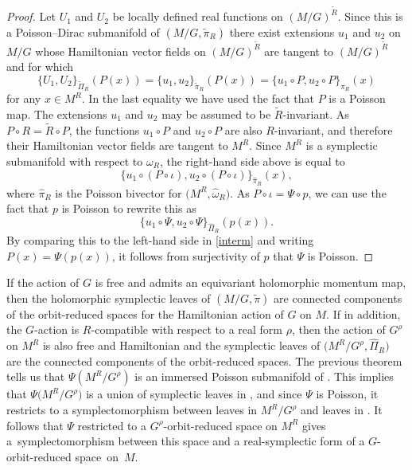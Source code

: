 \documentclass[pdftex]{sigma}
\numberwithin{equation}{section}
\begin{document}
\begin{proof}
	Let $U_1$ and $U_2$ be locally defined real functions on $(M/G)^{\widetilde{R}}$. Since this is a Poisson--Dirac submanifold of $(M/G,\widetilde{\pi}_R)$ there exist extensions $u_1$ and $u_2$ on $M/G$ whose Hamiltonian vector fields on $(M/G)^{\widetilde{R}}$ are tangent to $(M/G)^{\widetilde{R}}$ and for which
	\begin{equation}\label{interm}
		\{U_1,U_2\}_{\widetilde{\Pi}_R}(P(x))=\{u_1,u_2\}_{\widetilde{\pi}_R}(P(x))=\{u_1\circ P,u_2\circ P\}_{\pi_R}(x)
	\end{equation}
	for any $x\in M^R$. In the last equality we have used the fact that $P$ is a Poisson map. The extensions $u_1$ and $u_2$ may be assumed to be $\widetilde{R}$-invariant. As $P\circ R=\widetilde{R}\circ P$, the functions $u_1\circ P$ and $u_2\circ P$ are also $R$-invariant, and therefore their Hamiltonian vector fields are tangent to $M^R$. Since $M^R$ is a symplectic submanifold with respect to $\omega_R$, the right-hand side above is equal to
	\[
	\{u_1\circ(P\circ\iota),u_2\circ(P\circ\iota)\}_{\widehat{\pi}_R}(x),
	\]
	where $\widehat{\pi}_R$ is the Poisson bivector for $\bigl(M^R,\widehat{\omega}_R\bigr)$. As $P\circ\iota=\Psi\circ p$, we can use the fact that $p$ is Poisson to rewrite this as
	\[
	\{u_1\circ\Psi,u_2\circ\Psi\}_{\widehat{\Pi}_R}(p(x)).
	\]
	By comparing this to the left-hand side in \eqref{interm} and writing $P(x)=\Psi(p(x))$, it follows from surjectivity of $p$ that $\Psi$ is Poisson.
\end{proof}

\begin{Remark}If the action of $G$ is free and admits an equivariant holomorphic momentum map, then the holomorphic symplectic leaves of $(M/G,\widetilde{\pi})$ are connected components of the orbit-reduced spaces for the Hamiltonian action of $G$ on $M$. If in addition, the $G$-action is $R$-compatible with respect to a real form $\rho$, then the action of $G^\rho$ on $M^R$ is also free and Hamiltonian and the symplectic leaves of $\bigl(M^R/G^\rho,\widehat{\Pi}_R\bigr)$ are the connected components of the orbit-reduced spaces. The previous theorem tells us that $\Psi(M^R/G^\rho)$ is an immersed Poisson submanifold of . This implies that $\Psi\bigl(M^R/G^\rho\bigr)$ is a union of symplectic leaves in , and since $\Psi$ is Poisson, it restricts to a symplectomorphism between leaves in $M^R/G^\rho$ and leaves in . It follows that $\Psi$ restricted to a $G^\rho$-orbit-reduced space on $M^R$ gives a~symplectomorphism between this space and a real-symplectic form of a $G$-orbit-reduced space~on~$M$.
\end{Remark}
\end{document}
